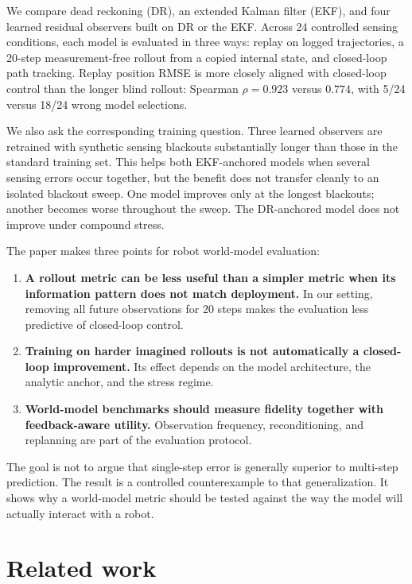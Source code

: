 \documentclass{article}
\begin{document}
We compare dead reckoning (DR), an extended Kalman filter (EKF), and four learned residual observers built on DR or the EKF. Across 24 controlled sensing conditions, each model is evaluated in three ways: replay on logged trajectories, a 20-step measurement-free rollout from a copied internal state, and closed-loop path tracking. Replay position RMSE is more closely aligned with closed-loop control than the longer blind rollout: Spearman $\rho=0.923$ versus $0.774$, with 5/24 versus 18/24 wrong model selections.

We also ask the corresponding training question. Three learned observers are retrained with synthetic sensing blackouts substantially longer than those in the standard training set. This helps both EKF-anchored models when several sensing errors occur together, but the benefit does not transfer cleanly to an isolated blackout sweep. One model improves only at the longest blackouts; another becomes worse throughout the sweep. The DR-anchored model does not improve under compound stress.

The paper makes three points for robot world-model evaluation:
\begin{enumerate}
    \item \textbf{A rollout metric can be less useful than a simpler metric when its information pattern does not match deployment.} In our setting, removing all future observations for 20 steps makes the evaluation less predictive of closed-loop control.
    \item \textbf{Training on harder imagined rollouts is not automatically a closed-loop improvement.} Its effect depends on the model architecture, the analytic anchor, and the stress regime.
    \item \textbf{World-model benchmarks should measure fidelity together with feedback-aware utility.} Observation frequency, reconditioning, and replanning are part of the evaluation protocol.
\end{enumerate}

The goal is not to argue that single-step error is generally superior to multi-step prediction. The result is a controlled counterexample to that generalization. It shows why a world-model metric should be tested against the way the model will actually interact with a robot.

\section{Related work}
\end{document}
